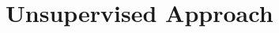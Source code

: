 \documentclass[letterpaper]{article}
\begin{document}





\section{Unsupervised Approach}\label{sec:approach}
\end{document}
